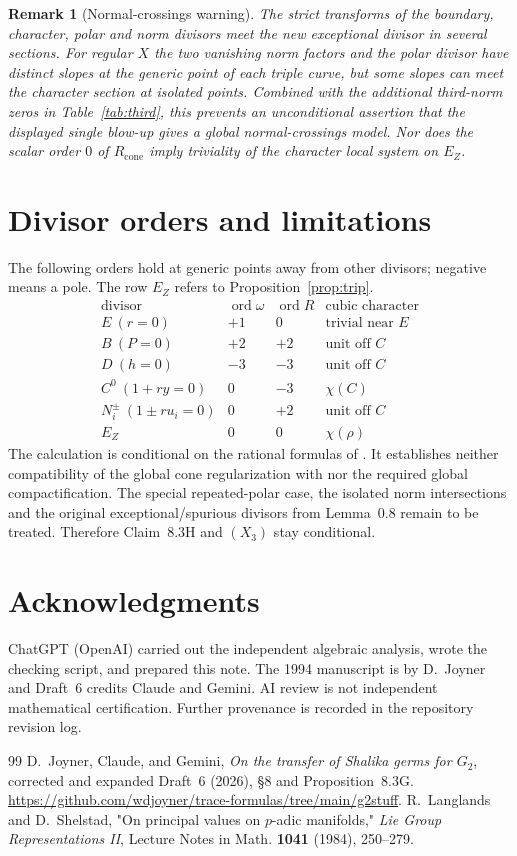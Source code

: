 \documentclass[12pt,letterpaper]{amsart}
\DeclareMathOperator{\ord}{ord}
\newtheorem{remark}[theorem]{Remark}
\begin{document}
\begin{remark}[Normal-crossings warning]\label{rem:warning}
The strict transforms of the boundary, character, polar and norm divisors meet the new exceptional divisor in several sections. For regular $X$ the two vanishing norm factors and the polar divisor have distinct slopes at the generic point of each triple curve, but some slopes can meet the character section at isolated points. Combined with the additional third-norm zeros in Table~\ref{tab:third}, this prevents an unconditional assertion that the displayed single blow-up gives a global normal-crossings model. Nor does the scalar order $0$ of $R_{\mathrm{cone}}$ imply triviality of the character local system on $E_Z$.
\end{remark}

\section{Divisor orders and limitations}
The following orders hold at generic points away from other divisors; negative means a pole. The row $E_Z$ refers to Proposition~\ref{prop:trip}.
\[
\begin{array}{c|cc|c}
\text{divisor}&\ord\omega&\ord R&\text{cubic character}\\\hline
E\ (r=0)&+1&0&\text{trivial near }E\\
B\ (P=0)&+2&+2&\text{unit off }C\\
D\ (h=0)&-3&-3&\text{unit off }C\\
C^0\ (1+r y=0)&0&-3&\chi(C)\\
N_i^{\pm}\ (1\pm r u_i=0)&0&+2&\text{unit off }C\\
E_Z&0&0&\chi(\rho)\end{array}
\]
The calculation is conditional on the rational formulas of \cite[(8.7h)]{Jo26}. It establishes neither compatibility of the global cone regularization with \cite{LS83} nor the required global compactification. The special repeated-polar case, the isolated norm intersections and the original exceptional/spurious divisors from Lemma~0.8 remain to be treated. Therefore Claim~8.3H and $(X_3)$ stay conditional.

\section*{Acknowledgments}
ChatGPT (OpenAI) carried out the independent algebraic analysis, wrote the checking script, and prepared this note. The 1994 manuscript is by D.~Joyner and Draft~6 credits Claude and Gemini. AI review is not independent mathematical certification. Further provenance is recorded in the repository revision log.
\begin{thebibliography}{99}
 D.~Joyner, Claude, and Gemini, \emph{On the transfer of Shalika germs for $G_2$}, corrected and expanded Draft~6 (2026), \S8 and Proposition~8.3G. \url{https://github.com/wdjoyner/trace-formulas/tree/main/g2stuff}.
 R.~Langlands and D.~Shelstad, "On principal values on $p$-adic manifolds," \emph{Lie Group Representations II}, Lecture Notes in Math. \textbf{1041} (1984), 250--279.
\end{thebibliography}
\end{document}
